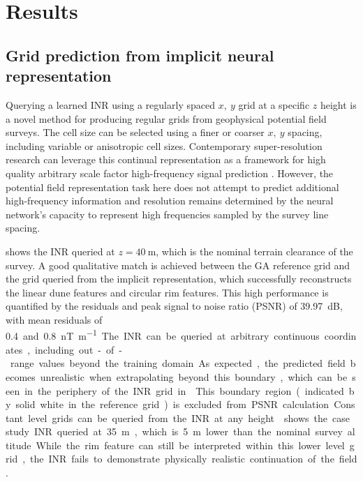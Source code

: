 \section{Results}
\subsection{Grid prediction from implicit neural representation}
Querying a learned INR using a regularly spaced \(x,\ y\) grid at a specific \(z\) height is a novel method for producing regular grids from geophysical potential field surveys.
The cell size can be selected using a finer or coarser \(x,\ y\) spacing, including variable or anisotropic cell sizes.
Contemporary super-resolution research can leverage this continual representation as a framework for high quality arbitrary scale factor high-frequency signal prediction \parencite[e.g][]{chenLearningContinuousImage2021}.
However, the potential field representation task here does not attempt to predict additional high-frequency information and resolution remains determined by the neural network's capacity to represent high frequencies sampled by the survey line spacing.

 shows the INR queried at \(z=\qty{40}{\m}\), which is the nominal terrain clearance of the survey.
A good qualitative match is achieved between the GA reference grid and the grid queried from the implicit representation, which successfully reconstructs the linear dune features and circular rim features.
This high performance is quantified by the residuals and peak signal to noise ratio (PSNR) of \qty{39.97}{\dB}, with mean residuals of \qty{0.4} and \qty{0.8}{\nano\tesla\per\m}.

The INR can be queried at arbitrary continuous coordinates, including out-of-range values beyond the training domain.
As expected, the predicted field becomes unrealistic when extrapolating beyond this boundary, which can be seen in the periphery of the INR grid in .
This boundary region (indicated by solid white in the reference grid) is excluded from PSNR calculation.

Constant level grids can be queried from the INR at any height.
 shows the case study INR queried at \qty{35}{\m}, which is \qty{5}{\m} lower than the nominal survey altitude.
While the rim feature can still be interpreted within this lower level grid, the INR fails to demonstrate physically realistic continuation of the field.

